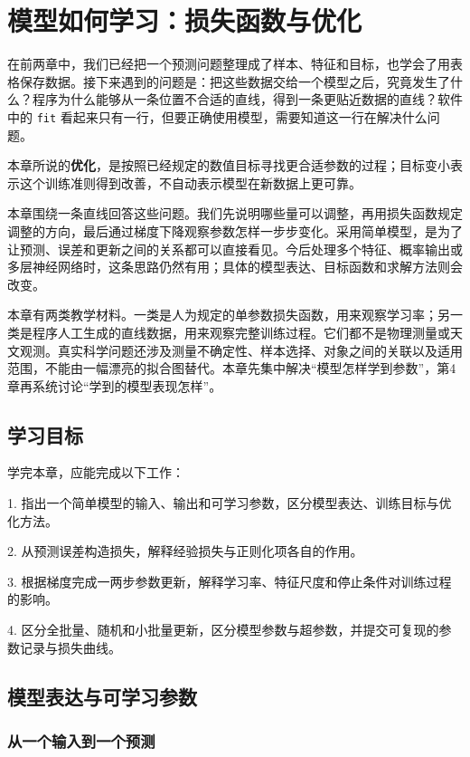 \chapter{模型如何学习：损失函数与优化}
在前两章中，我们已经把一个预测问题整理成了样本、特征和目标，也学会了用表格保存数据。接下来遇到的问题是：把这些数据交给一个模型之后，究竟发生了什么？程序为什么能够从一条位置不合适的直线，得到一条更贴近数据的直线？软件中的 \texttt{fit} 看起来只有一行，但要正确使用模型，需要知道这一行在解决什么问题。

本章所说的\textbf{优化}，是按照已经规定的数值目标寻找更合适参数的过程；目标变小表示这个训练准则得到改善，不自动表示模型在新数据上更可靠。

本章围绕一条直线回答这些问题。我们先说明哪些量可以调整，再用损失函数规定调整的方向，最后通过梯度下降观察参数怎样一步步变化。采用简单模型，是为了让预测、误差和更新之间的关系都可以直接看见。今后处理多个特征、概率输出或多层神经网络时，这条思路仍然有用；具体的模型表达、目标函数和求解方法则会改变。

本章有两类教学材料。一类是人为规定的单参数损失函数，用来观察学习率；另一类是程序人工生成的直线数据，用来观察完整训练过程。它们都不是物理测量或天文观测。真实科学问题还涉及测量不确定性、样本选择、对象之间的关联以及适用范围，不能由一幅漂亮的拟合图替代。本章先集中解决``模型怎样学到参数''，第4章再系统讨论``学到的模型表现怎样''。

\section*{学习目标}

学完本章，应能完成以下工作：

1. 指出一个简单模型的输入、输出和可学习参数，区分模型表达、训练目标与优化方法。

2. 从预测误差构造损失，解释经验损失与正则化项各自的作用。

3. 根据梯度完成一两步参数更新，解释学习率、特征尺度和停止条件对训练过程的影响。

4. 区分全批量、随机和小批量更新，区分模型参数与超参数，并提交可复现的参数记录与损失曲线。

\section{模型表达与可学习参数}

\subsection{从一个输入到一个预测}

